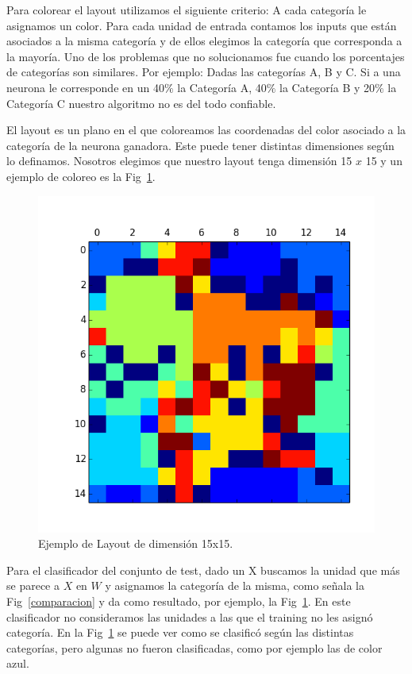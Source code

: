 Para colorear el layout utilizamos el siguiente criterio: A cada categoría le asignamos un color. Para cada unidad de entrada contamos los inputs que están asociados a la misma categoría y de ellos elegimos la categoría que corresponda a la mayoría. Uno de los problemas que no solucionamos fue cuando los porcentajes de categorías son similares. Por ejemplo: Dadas las categorías A, B y C. Si a una neurona le corresponde en un 40$\%$ la Categoría A, 40$\%$ la Categoría B y 20$\%$ la Categoría C nuestro algoritmo no es del todo confiable.

El layout es un plano en el que coloreamos las coordenadas del color asociado a la categoría de la neurona ganadora. Este puede tener distintas dimensiones según lo definamos. Nosotros elegimos que nuestro layout tenga dimensión 15 $x$ 15 y un ejemplo de coloreo es la Fig~\ref{ejemplo}.

\begin{figure}[ht!]
	\centering
	\includegraphics[width=0.7\linewidth]{img/parte2-ejemplocoloreo.png}
	\caption{Ejemplo de Layout de dimensión 15x15.}
	\label{ejemplo}
\end{figure}

Para el clasificador del conjunto de test, dado un X buscamos la unidad que más se parece a $X$ en $W$ y asignamos la categoría de la misma, como señala la Fig~\ref{comparacion} y da como resultado, por ejemplo, la Fig~\ref{ejemplo}. En este clasificador no consideramos las unidades a las que el training no les asignó categoría. En la Fig~\ref{ejemplo} se puede ver como se clasificó según las distintas categorías, pero algunas no fueron clasificadas, como por ejemplo las de color azul.

